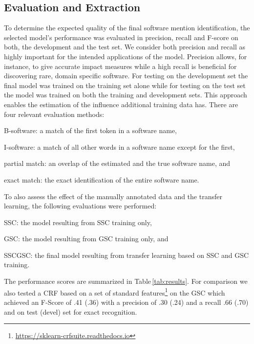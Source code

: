 \documentclass[runningheads]{llncs}
\newcommand{\tabref}[1]{Table\,\ref{#1}}
\begin{document}
\subsection{Evaluation and Extraction}
To determine the expected quality of the final software mention identification, the selected model's performance was evaluated in precision, recall and F-score on both, the development and the test set.
We consider both precision and recall as highly important for the intended applications of the model. 
Precision allows, for instance, to give accurate impact measures while a high recall is beneficial for discovering rare, domain specific software. 
For testing on the development set the final model was trained on the training set alone while for testing on the test set the model was trained on both the training and development sets. 
This approach enables the estimation of the influence additional training data has. 
There are four relevant evaluation methods:
\begin{inparaenum}[1.)]
    \item B-software: a match of the first token in a software name,
    \item I-software: a match of all other words in a software name except for the first, 
    \item partial match: an overlap of the estimated and the true software name, and
    \item exact match: the exact identification of the entire software name. 
\end{inparaenum}
To also assess the effect of the manually annotated data and the transfer learning, the following evaluations were performed:
\begin{inparaenum}[1.)]
    \item SSC: the model resulting from SSC training only,
    \item GSC: the model resulting from GSC training only, and 
    \item SSCGSC: the final model resulting from transfer learning based on SSC and GSC training.
\end{inparaenum}
The performance scores are summarized in \tabref{tab:results}.
For comparison we also tested a CRF based on a set of standard features\footnote{\url{https://sklearn-crfsuite.readthedocs.io}} on the GSC which achieved an F-Score of .41 (.36) with a precision of .30 (.24) and a recall .66 (.70) and  on test (devel) set for exact recognition. 
\end{document}
